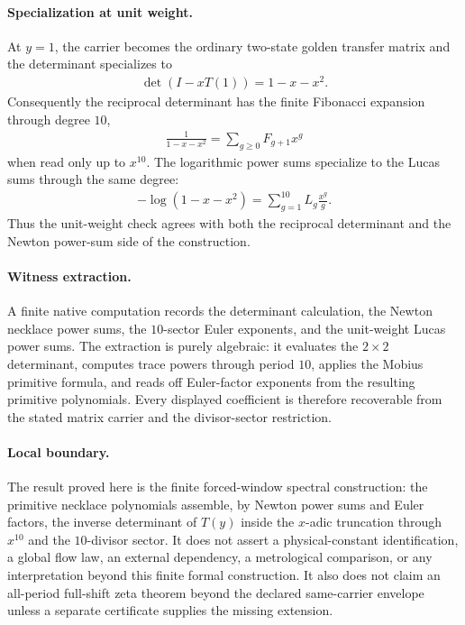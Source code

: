 \paragraph{Specialization at unit weight.}
At $y=1$, the carrier becomes the ordinary two-state golden transfer matrix and the determinant specializes to
$$
\begin{aligned}
\det(I-xT(1))=1-x-x^2.
\end{aligned}
$$
Consequently the reciprocal determinant has the finite Fibonacci expansion through degree $10$,
$$
\begin{aligned}
\frac{1}{1-x-x^2}=\sum_{g\geq 0}F_{g+1}x^g
\end{aligned}
$$
when read only up to $x^{10}$. The logarithmic power sums specialize to the Lucas sums through the same degree:
$$
\begin{aligned}
-\log(1-x-x^2)=\sum_{g=1}^{10}L_g\frac{x^g}{g}.
\end{aligned}
$$
Thus the unit-weight check agrees with both the reciprocal determinant and the Newton power-sum side of the construction.

\paragraph{Witness extraction.}
A finite native computation records the determinant calculation, the Newton necklace power sums, the $10$-sector Euler exponents, and the unit-weight Lucas power sums. The extraction is purely algebraic: it evaluates the $2\times 2$ determinant, computes trace powers through period $10$, applies the Mobius primitive formula, and reads off Euler-factor exponents from the resulting primitive polynomials. Every displayed coefficient is therefore recoverable from the stated matrix carrier and the divisor-sector restriction.

\paragraph{Local boundary.}
The result proved here is the finite forced-window spectral construction: the primitive necklace polynomials assemble, by Newton power sums and Euler factors, the inverse determinant of $T(y)$ inside the $x$-adic truncation through $x^{10}$ and the $10$-divisor sector. It does not assert a physical-constant identification, a global flow law, an external dependency, a metrological comparison, or any interpretation beyond this finite formal construction. It also does not claim an all-period full-shift zeta theorem beyond the declared same-carrier envelope unless a separate certificate supplies the missing extension.
